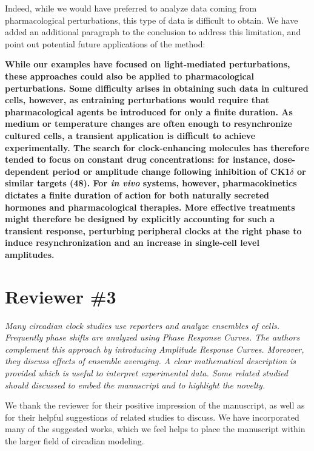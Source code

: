 \documentclass[11pt, letterpaper]{article}
\newenvironment{reviewer}{\itshape\color{gray}}{}
\newenvironment{manuscript}[1]{\begin{center}\begin{tcolorbox}[colback=green!5!white,colframe=green!75!black,width=0.8\textwidth,title={#1},breakable,fonttitle=\bfseries]}{\end{tcolorbox}\end{center}}
\begin{document}
Indeed, while we would have preferred to analyze data coming from pharmacological perturbations, this type of data is difficult to obtain.
We have added an additional paragraph to the conclusion to address this limitation, and point out potential future applications of the method:

\begin{manuscript}{Page 18}
\bfseries
While our examples have focused on light-mediated perturbations, these approaches could also be applied to pharmacological perturbations.
Some difficulty arises in obtaining such data in cultured cells, however, as entraining perturbations would require that pharmacological agents be introduced for only a finite duration.
As medium or temperature changes are often enough to resynchronize cultured cells, a transient application is difficult to achieve experimentally.
The search for clock-enhancing molecules has therefore tended to focus on constant drug concentrations: for instance, dose-dependent period or amplitude change following inhibition of CK1$\delta$ or similar targets (48).
For {\itshape in vivo} systems, however, pharmacokinetics dictates a finite duration of action for both naturally secreted hormones and pharmacological therapies.
More effective treatments might therefore be designed by explicitly accounting for such a transient response, perturbing peripheral clocks at the right phase to induce resynchronization and an increase in single-cell level amplitudes.
\end{manuscript}

\section*{Reviewer \#3}

\begin{reviewer}
Many circadian clock studies use reporters and analyze ensembles of cells.
Frequently phase shifts are analyzed using Phase Response Curves.
The authors complement this approach by introducing Amplitude Response Curves.
Moreover, they discuss effects of ensemble averaging.
A clear mathematical description is provided which is useful to interpret experimental data.
Some related studied should discussed to embed the manuscript and to highlight the novelty.

\end{reviewer}
 
We thank the reviewer for their positive impression of the manuscript, as well as for their helpful suggestions of related studies to discuss. We have incorporated many of the suggested works, which we feel helps to place the manuscript within the larger field of circadian modeling.
\end{document}
